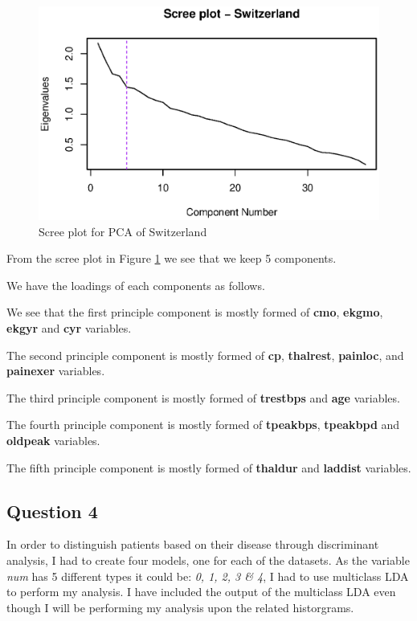 \documentclass[a4paper]{article}
\begin{document}
\begin{figure}[H]
	\begin{center}
		\includegraphics[width=12cm]{question3output/swiscreeplot.eps}
	\end{center}
	\caption{Scree plot for PCA of Switzerland}
	\label{q3-swi-screeplot}
\end{figure}

From the scree plot in Figure \ref{q3-swi-screeplot} we see that we keep 5
components.

We have the loadings of each components as follows.



We see that the first principle component is mostly formed of \textbf{cmo},
\textbf{ekgmo}, \textbf{ekgyr} and \textbf{cyr} variables.

The second principle component is mostly formed of \textbf{cp},
\textbf{thalrest}, \textbf{painloc}, and \textbf{painexer} variables.

The third principle component is mostly formed of \textbf{trestbps} and
\textbf{age} variables.

The fourth principle component is mostly formed of \textbf{tpeakbps},
\textbf{tpeakbpd} and \textbf{oldpeak} variables.

The fifth principle component is mostly formed of \textbf{thaldur} and
\textbf{laddist} variables.

\newpage
\subsection{Question 4}

In order to distinguish patients based on their disease through discriminant
analysis, I had to create four models, one for each of the datasets. As the
variable \textit{num} has 5 different types it could be: \textit{0, 1, 2, 3 \&
4}, I had to use multiclass LDA to perform my analysis. I have included the
output of the multiclass LDA even though I will be performing my analysis upon
the related historgrams.
\end{document}
